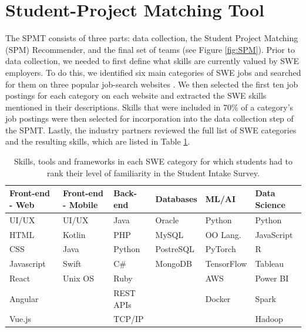 \section{Student-Project Matching Tool}

The SPMT consists of three parts: data collection, the Student Project Matching (SPM) Recommender, and the final set of teams (see Figure \ref{fig:SPM}). Prior to data collection, we needed to first define what skills are currently valued by SWE employers. To do this, we identified six main categories of SWE jobs and searched for them on three popular job-search websites \cite{noauthor_job_nodate-1, noauthor_job_nodate, noauthor_jobs_nodate}. We then selected the first ten job postings for each category on each website and extracted the SWE skills mentioned in their descriptions. Skills that were included in 70\% of a category's job postings were then selected for incorporation into the data collection step of the SPMT. Lastly, the industry partners reviewed the full list of SWE categories and the resulting skills, which are listed in Table \ref{tab:student_skills_survey}.

\begin{table}[t]
    \centering
    \scriptsize
    \begin{tabular}{p{1.5cm}p{1.5cm}p{1.5cm}p{1.5cm}p{1.5cm}p{1.8cm}}
    \hline
        \textbf{Front-end - Web} & \textbf{Front-end - Mobile} & \textbf{Back-end} & \textbf{Databases} & \textbf{ML/AI} & \textbf{Data Science} \\ \hline
        UI/UX & UI/UX & Java & Oracle & Python & Python \\ 
        HTML & Kotlin & PHP & MySQL & OO Lang. & JavaScript \\ 
        CSS & Java & Python & PostreSQL & PyTorch & R \\ 
        Javascript & Swift & C\# & MongoDB & TensorFlow & Tableau \\ 
        React & Unix OS & Ruby & ~ & AWS & Power BI \\ 
        Angular & ~ & REST APIs & ~ & Docker & Spark \\ 
        Vue.js & ~ & TCP/IP & ~ & ~ & Hadoop \\ \hline
    \end{tabular}
    \caption{Skills, tools and frameworks in each SWE category for which students had to rank their level of familiarity in the Student Intake Survey.}
    \label{tab:student_skills_survey}
\end{table}




